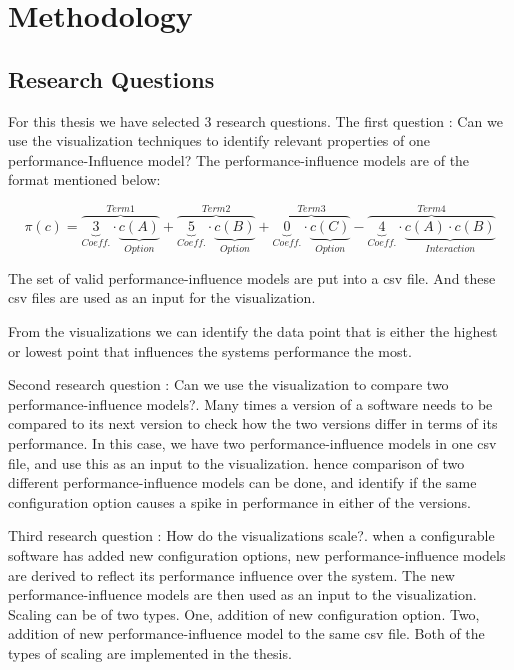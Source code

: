\chapter{Methodology}
\label{example}

\section{Research Questions}
For this thesis we have selected 3 research questions. The first question : Can we use the visualization techniques to identify relevant properties of one performance-Influence model? The performance-influence models are of the format mentioned below:

\begin{equation*}
  \pi {(c)} = \overbrace{\underbrace {3}_{Coeff.} \cdot  \underbrace{{c(A)}}_{Option}}^{Term 1}  + \overbrace{ \underbrace{5}_{Coeff.} \cdot \underbrace{{c(B)}}_{Option}}^{Term 2} + \overbrace{\underbrace{0}_{Coeff.} \cdot \underbrace{{c(C)}}_{Option}}^{Term 3} - \overbrace{\underbrace{4}_{Coeff.} \cdot \underbrace{{ c(A)} \cdot {c(B)}}_{Interaction}}^{Term 4}
\end{equation*}

The set of valid performance-influence models are put into a csv file. And these csv files are used as an input for the visualization. 

From the visualizations we can identify the data point that is either the highest or lowest point that influences the systems performance the most.

Second research question : Can we use the visualization to compare two performance-influence models?. Many times a version of a software needs to be compared to its next version to check how the two versions differ in terms of its performance. In this case, we have two performance-influence models in one csv file, and use this as an input to the visualization. hence comparison of two different performance-influence models can be done, and identify if the same configuration option causes a spike in performance in either of the versions.

Third research question : How do the visualizations scale?. when a configurable software has added new configuration options, new performance-influence models are derived to reflect its performance influence over the system. The new performance-influence models are then used as an input to the visualization. Scaling can be of two types. One, addition of new configuration option. Two, addition of new performance-influence model to the same csv file. Both of the types of scaling are implemented in the thesis.

